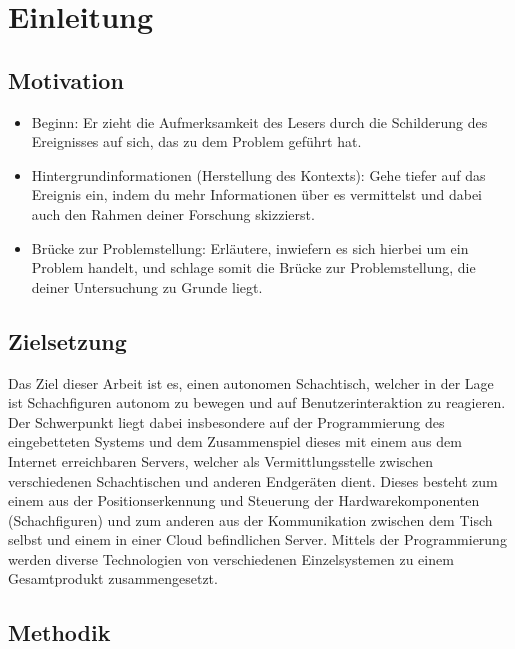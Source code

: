 \hypertarget{einleitung}{%
\section{Einleitung}\label{einleitung}}

\hypertarget{motivation}{%
\subsection{Motivation}\label{motivation}}

\begin{itemize}
\tightlist
\item
  Beginn: Er zieht die Aufmerksamkeit des Lesers durch die Schilderung
  des Ereignisses auf sich, das zu dem Problem geführt hat.
\item
  Hintergrundinformationen (Herstellung des Kontexts): Gehe tiefer auf
  das Ereignis ein, indem du mehr Informationen über es vermittelst und
  dabei auch den Rahmen deiner Forschung skizzierst.
\item
  Brücke zur Problemstellung: Erläutere, inwiefern es sich hierbei um
  ein Problem handelt, und schlage somit die Brücke zur Problemstellung,
  die deiner Untersuchung zu Grunde liegt.
\end{itemize}

\hypertarget{zielsetzung}{%
\subsection{Zielsetzung}\label{zielsetzung}}

Das Ziel dieser Arbeit ist es, einen autonomen Schachtisch, welcher in
der Lage ist Schachfiguren autonom zu bewegen und auf
Benutzerinteraktion zu reagieren. Der Schwerpunkt liegt dabei
insbesondere auf der Programmierung des eingebetteten Systems und dem
Zusammenspiel dieses mit einem aus dem Internet erreichbaren Servers,
welcher als Vermittlungsstelle zwischen verschiedenen Schachtischen und
anderen Endgeräten dient. Dieses besteht zum einem aus der
Positionserkennung und Steuerung der Hardwarekomponenten (Schachfiguren)
und zum anderen aus der Kommunikation zwischen dem Tisch selbst und
einem in einer Cloud befindlichen Server. Mittels der Programmierung
werden diverse Technologien von verschiedenen Einzelsystemen zu einem
Gesamtprodukt zusammengesetzt.

\hypertarget{methodik}{%
\subsection{Methodik}\label{methodik}}

